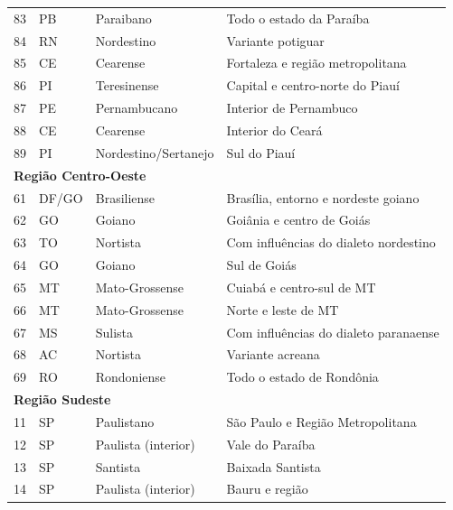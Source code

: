 \begin{table}[ht]
\begin{tabular}{llll}
    83 & PB & Paraibano               & Todo o estado da Paraíba                 \\
    84 & RN & Nordestino              & Variante potiguar                        \\
    85 & CE & Cearense                & Fortaleza e região metropolitana         \\
    86 & PI & Teresinense             & Capital e centro-norte do Piauí          \\
    87 & PE & Pernambucano            & Interior de Pernambuco                   \\
    88 & CE & Cearense                & Interior do Ceará                        \\
    89 & PI & Nordestino/Sertanejo    & Sul do Piauí                             \\
    \midrule
    \multicolumn{4}{l}{\textbf{Região Centro-Oeste}} \\ 
    61 & DF/GO & Brasiliense       & Brasília, entorno e nordeste goiano   \\
    62 & GO    & Goiano            & Goiânia e centro de Goiás             \\
    63 & TO    & Nortista          & Com influências do dialeto nordestino \\
    64 & GO    & Goiano            & Sul de Goiás                          \\
    65 & MT    & Mato-Grossense    & Cuiabá e centro-sul de MT             \\
    66 & MT    & Mato-Grossense    & Norte e leste de MT                   \\
    67 & MS    & Sulista           & Com influências do dialeto paranaense \\
    68 & AC    & Nortista          & Variante acreana                      \\
    69 & RO    & Rondoniense       & Todo o estado de Rondônia             \\
    \midrule
    \multicolumn{4}{l}{\textbf{Região Sudeste}} \\ 
    11 & SP & Paulistano            & São Paulo e Região Metropolitana        \\
    12 & SP & Paulista (interior)   & Vale do Paraíba                         \\
    13 & SP & Santista              & Baixada Santista                        \\
    14 & SP & Paulista (interior)   & Bauru e região                          \\

\end{tabular}
\end{table}
